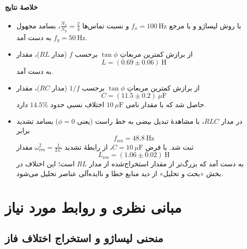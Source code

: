 \documentclass[a4paper, 11pt]{article}
\begin{document}
\paragraph{خلاصهٔ نتایج}
\begin{itemize}
    \item با روش لیساژو و با مرجع $f_x=100~\mathrm{Hz}$ و نسبت تماس‌ها $\frac{N_x}{N_y}=\frac{2}{4}$، بسامد مجهول $f_y=50~\mathrm{Hz}$ به دست آمد.
    \item از برازش کمترین مربعاتِ \(\tan\phi\) برحسب \(f\) (مدار $RL$)، مقدار
    \[
    L=(0.69\pm 0.06)\ \mathrm{H}
    \]
    به دست آمد.
    \item از برازش کمترین مربعاتِ \(\tan\phi\) برحسب \(1/f\) (مدار $RC$)، مقدار
    \[
    C=(11.5\pm 0.2)\ \mu\mathrm{F}
    \]
    حاصل شد که با مقدار نامی \(10~\mu\mathrm{F}\) اختلاف نسبی حدود \(14.5\%\) دارد.
    \item در مدار $RLC$، با مشاهدهٔ تبدیل بیضی به خط راست (یعنی \(\phi=0\)) بسامد تشدید برابر
    \[
    f_{\mathrm{res}}=48.8~\mathrm{Hz}
    \]
    ثبت شد. با فرض \(C=10~\mu\mathrm{F}\)، از رابطهٔ تشدید \( \omega_{\mathrm{res}}^2=\frac{1}{LC}\) مقدار
    \[
    L_{\mathrm{res}}=(1.06\pm 0.02)\ \mathrm{H}
    \]
    به دست آمد که بزرگ‌تر از مقدار استخراج‌شده از مدار $RL$ است؛ این اختلاف در بخش «بحث و تحلیل» از دید منابع خطا و ناایده‌آلی عناصر تحلیل می‌شود.
\end{itemize}

\section{مبانی نظری و روابط مورد نیاز}

\subsection{منحنی لیساژو و استخراج اختلاف فاز}
\end{document}
